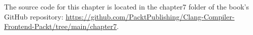 The source code for this chapter is located in the chapter7 folder of the book’s GitHub repository: \url{https://github.com/PacktPublishing/Clang-Compiler-Frontend-Packt/tree/main/chapter7}.